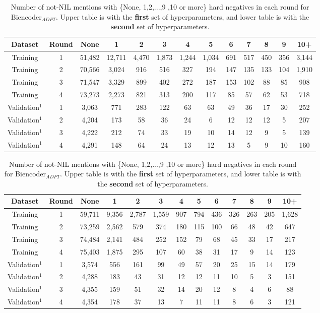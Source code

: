 \documentclass{report}
\theoremstyle{definition}
\theoremstyle{remark}
\begin{document}
\begin{table}
    \centering
    \hspace*{-1.2cm}\begin{tabular}{ccccccccccccc}
    Dataset  & Round & None & 1 & 2 & 3 & 4 & 5 & 6 & 7 & 8 & 9 & 10+ \\
    \hline
    Training & 1 & 51,482&12,711&4,470&1,873&1,244&1,034&691	&517&	450&356&3,144\\
    Training & 2 & 70,566&3,024	&916&	516	&327	&194&	147&	135	&133&	104&1,910\\
    Training & 3 & 71,547&3,329	&899&	402	&272	&187&	153&	102&	88&	85&908\\
    Training & 4 & 73,273&2,273	&821&	313	&200	&117&	85	&57	&62&	53&718\\
    \hline
    Validation$^1$ & 1 & 3,063&771&283&	122&63	&63	&49&	36	&17&	30&252\\
    Validation$^1$ & 2 &4,204&173&58	&36&24&	6	&12&	12	&12&	5 &207\\
    Validation$^1$ & 3 & 4,222&212&74&	33&19	&10	&14&	12&	9&	5&139\\
    Validation$^1$ & 4 & 4,291&148&64&	24&13	&12	&13&	5&	9&	10 &160\\
    \end{tabular}
    
    \vspace*{0.5cm}\hspace*{-1cm}\begin{tabular}{ccccccccccccc}
    Dataset  & Round & None & 1 & 2 & 3 & 4 & 5 & 6 & 7 & 8 & 9 & 10+ \\
    \hline
    Training & 1 & 59,711&9,356&2,787&1,559&907&794&436&326&263&205&1,628\\
    Training & 2 & 73,259&2,562&579&374&180&115&100&66&48&42&647\\
    Training & 3 & 74,484&2,141&484&252&152&79&68&45&33&17&217\\
    Training & 4 & 75,403&1,875&295&107&60&38&31&17&9&14&123\\
    \hline
    Validation$^1$ & 1 & 3,574&556&161&99&49&57&20&25&15&14&179\\
    Validation$^1$ & 2 &4,288&183&43&31&12&12&11&10&5&3&151\\
    Validation$^1$ & 3 &4,355&159&51&32&14&20&12&8&4&6&88\\
    Validation$^1$ & 4 &4,354&178&37&13&7&11&11&8&6&3&121 \\
    \end{tabular}
    
    \caption{Number of not-NIL mentions with \{None, 1,2,...,9 ,10 or more\} hard negatives in each round for Biencoder$_{ADPT}$. Upper table is with the \textbf{first} set of hyperparameters, and lower table is with the \textbf{second} set of hyperparameters.}
    \label{tab:hardnegsbiencoder1}
\end{table}
\end{document}
